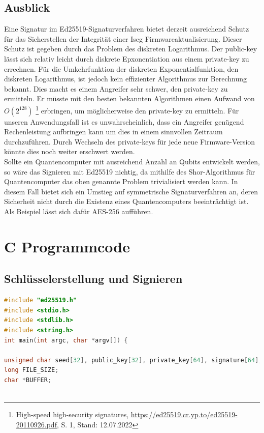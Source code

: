 \documentclass[thesis=bachelor,faculty=cb]{hsmw-thesis}
\begin{document}
{\section{Ausblick}
Eine Signatur im Ed25519-Signaturverfahren bietet derzeit ausreichend Schutz für das Sicherstellen der Integrität einer Iseg Firmwareaktualisierung. Dieser Schutz ist gegeben durch das Problem des diskreten Logarithmus. Der public-key lässt sich relativ leicht durch diskrete Epxonentiation aus einem private-key zu errechnen. Für die Umkehrfunktion der diskreten Exponentialfunktion, den diskreten Logarithmus, ist jedoch kein effizienter Algorithmus zur Berechnung bekannt. Dies macht es einem Angreifer sehr schwer, den private-key zu ermitteln. Er müsste mit den besten bekannten Algorithmen einen Aufwand von \begin{math}O(2^{128})\end{math} \footnote{\raggedright High-speed high-security signatures, \url{https://ed25519.cr.yp.to/ed25519-20110926.pdf}, S. 1, Stand: 12.07.2022} erbringen, um möglicherweise den private-key zu ermitteln. Für unseren Anwendungsfall ist es unwahrscheinlich, dass ein Angreifer genügend Rechenleistung aufbringen kann um dies in einem sinnvollen Zeitraum durchzuführen. Durch Wechseln des private-keys für jede neue Firmware-Version könnte dies noch weiter erschwert werden.
\\[1cm]
Sollte ein Quantencomputer mit ausreichend Anzahl an Qubits entwickelt werden, so wäre das Signieren mit Ed25519 nichtig, da mithilfe des Shor-Algorithmus \cite{SHOR} für Quantencomputer das oben genannte Problem trivialisiert werden kann. In diesem Fall bietet sich ein Umstieg auf symmetrische Signaturverfahren an, deren Sicherheit nicht durch die Existenz eines Quantencomputers beeinträchtigt ist. Als Beispiel lässt sich dafür AES-256 aufführen.

\appendix %
\chapter{C Programmcode}
\section{Schlüsselerstellung und Signieren}
\begin{lstlisting}[language=C]
#include "ed25519.h"
#include <stdio.h>
#include <stdlib.h>
#include <string.h>
int main(int argc, char *argv[]) {

unsigned char seed[32], public_key[32], private_key[64], signature[64];
long FILE_SIZE;
char *BUFFER;



\end{lstlisting}}
\end{document}
